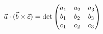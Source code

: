 \documentclass[preview]{standalone}
\begin{document}
\begin{align*}
\special{dvisvgm:raw <g id='unique000'>}\vec{a} \cdot (\vec{b} \times \vec{c}) = \det\begin{pmatrix} a_1 & a_2 & a_3 \\ b_1 & b_2 & b_3 \\ c_1 & c_2 & c_3 \end{pmatrix}\special{dvisvgm:raw </g>}
\end{align*}
\end{document}
